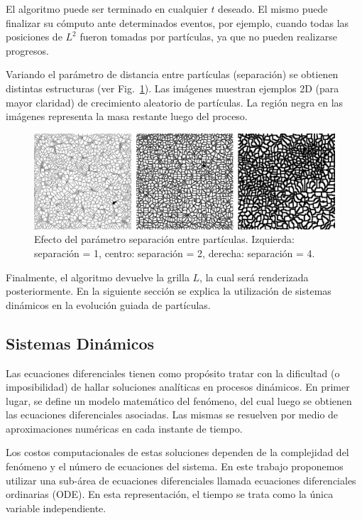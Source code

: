 El algoritmo puede ser terminado en cualquier $t$ deseado. El mismo puede finalizar su c\'omputo ante determinados eventos, por ejemplo, cuando todas las posiciones de $L^{2}$ fueron tomadas por part\'iculas, ya que no pueden realizarse progresos.

Variando el par\'ametro de distancia entre part\'iculas (separación) se obtienen distintas estructuras (ver Fig.~\ref{fg:sistdin1}). Las im\'agenes muestran ejemplos 2D (para mayor claridad) de crecimiento aleatorio de part\'iculas. La regi\'on negra en las im\'agenes representa la masa restante luego del proceso.


\begin{figure}[htb!]
  \centerline{\includegraphics[width=13cm]{figures/Fig1}}
  \caption[Efecto del parámetro separación entre partículas.]{Efecto del parámetro separación entre partículas. Izquierda: separaci\'on = 1, centro: separaci\'on = 2, derecha: separaci\'on = 4.}
  \label{fg:sistdin1}
\end{figure}

Finalmente, el algoritmo devuelve la grilla $L$, la cual ser\'a renderizada posteriormente. En la siguiente secci\'on se explica la utilizaci\'on de sistemas din\'amicos en la evoluci\'on guiada de part\'iculas.

\subsection{Sistemas Din\'amicos}

Las ecuaciones diferenciales tienen como prop\'osito tratar con la dificultad (o imposibilidad) de hallar soluciones anal\'iticas en procesos din\'amicos.
En primer lugar, se define un modelo matem\'atico del fenómeno, del cual luego se obtienen 
las ecuaciones diferenciales asociadas. Las mismas se resuelven por medio de aproximaciones num\'ericas en cada instante de tiempo.

Los costos computacionales de estas soluciones dependen de la complejidad del fenómeno y el n\'umero de ecuaciones del sistema. En este trabajo proponemos utilizar una sub-\'area de ecuaciones diferenciales llamada ecuaciones diferenciales ordinarias (ODE). En esta representaci\'on, el tiempo se trata como la \'unica variable independiente.


